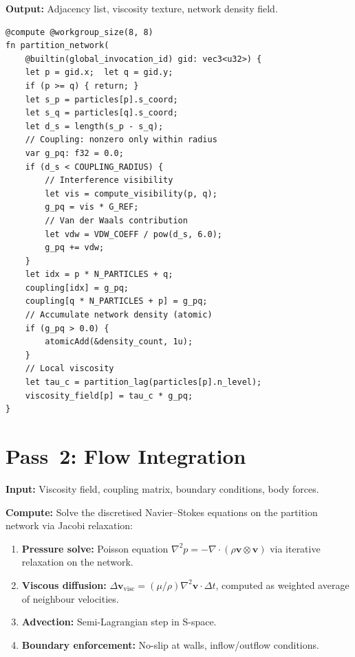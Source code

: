 \documentclass[twocolumn,10pt,a4paper]{article}
\theoremstyle{plain}
\theoremstyle{definition}
\theoremstyle{remark}
\begin{document}
\textbf{Output:} Adjacency list, viscosity texture, network density field.

\begin{lstlisting}[style=wgsl,caption={Pass 1: Partition Network (WGSL)}]
@compute @workgroup_size(8, 8)
fn partition_network(
    @builtin(global_invocation_id) gid: vec3<u32>) {
    let p = gid.x;  let q = gid.y;
    if (p >= q) { return; }
    let s_p = particles[p].s_coord;
    let s_q = particles[q].s_coord;
    let d_s = length(s_p - s_q);
    // Coupling: nonzero only within radius
    var g_pq: f32 = 0.0;
    if (d_s < COUPLING_RADIUS) {
        // Interference visibility
        let vis = compute_visibility(p, q);
        g_pq = vis * G_REF;
        // Van der Waals contribution
        let vdw = VDW_COEFF / pow(d_s, 6.0);
        g_pq += vdw;
    }
    let idx = p * N_PARTICLES + q;
    coupling[idx] = g_pq;
    coupling[q * N_PARTICLES + p] = g_pq;
    // Accumulate network density (atomic)
    if (g_pq > 0.0) {
        atomicAdd(&density_count, 1u);
    }
    // Local viscosity
    let tau_c = partition_lag(particles[p].n_level);
    viscosity_field[p] = tau_c * g_pq;
}
\end{lstlisting}

\section{Pass~2: Flow Integration}
\label{sec:pass2}

\textbf{Input:} Viscosity field, coupling matrix, boundary conditions, body forces.

\textbf{Compute:} Solve the discretised Navier--Stokes equations on the partition network via Jacobi relaxation:
\begin{enumerate}
    \item \textbf{Pressure solve:} Poisson equation $\nabla^2 p = -\nabla \cdot (\rho \mathbf{v} \otimes \mathbf{v})$ via iterative relaxation on the network.
    \item \textbf{Viscous diffusion:} $\Delta \mathbf{v}_{\mathrm{visc}} = (\mu/\rho)\nabla^2\mathbf{v} \cdot \Delta t$, computed as weighted average of neighbour velocities.
    \item \textbf{Advection:} Semi-Lagrangian step in S-space.
    \item \textbf{Boundary enforcement:} No-slip at walls, inflow/outflow conditions.
\end{enumerate}
\end{document}
